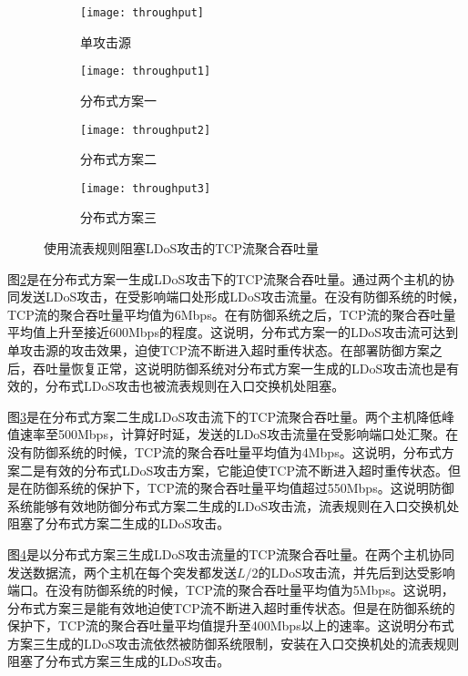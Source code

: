 \begin{figure}
    \begin{subfigure}{.49\textwidth}
        \centering
        \texttt{[image: throughput]}
        \caption{单攻击源}
        \label{fig:throughput-single}
    \end{subfigure}
    \begin{subfigure}{.49\textwidth}
        \centering
        \texttt{[image: throughput1]}
        \caption{分布式方案一}
        \label{fig:throughput-2h-mod1}
    \end{subfigure}

    \begin{subfigure}{.49\textwidth}
        \centering
        \texttt{[image: throughput2]}
        \caption{分布式方案二}
        \label{fig:throughput-2h-mod2}
    \end{subfigure}
    \begin{subfigure}{.49\textwidth}
        \centering
        \texttt{[image: throughput3]}
        \caption{分布式方案三}
        \label{fig:throughput-2h-mod3}
    \end{subfigure}


    \caption{使用流表规则阻塞LDoS攻击的TCP流聚合吞吐量}
    \label{fig:throughput-all}
\end{figure}

图\ref{fig:throughput-2h-mod1}是在分布式方案一生成LDoS攻击下的TCP流聚合吞吐量。通过两个主机的协同发送LDoS攻击，在受影响端口处形成LDoS攻击流量。在没有防御系统的时候，TCP流的聚合吞吐量平均值为6Mbps。在有防御系统之后，TCP流的聚合吞吐量平均值上升至接近600Mbps的程度。这说明，分布式方案一的LDoS攻击流可达到单攻击源的攻击效果，迫使TCP流不断进入超时重传状态。在部署防御方案之后，吞吐量恢复正常，这说明防御系统对分布式方案一生成的LDoS攻击流也是有效的，分布式LDoS攻击也被流表规则在入口交换机处阻塞。

图\ref{fig:throughput-2h-mod2}是在分布式方案二生成LDoS攻击流下的TCP流聚合吞吐量。两个主机降低峰值速率至500Mbps，计算好时延，发送的LDoS攻击流量在受影响端口处汇聚。在没有防御系统的时候，TCP流的聚合吞吐量平均值为4Mbps。这说明，分布式方案二是有效的分布式LDoS攻击方案，它能迫使TCP流不断进入超时重传状态。但是在防御系统的保护下，TCP流的聚合吞吐量平均值超过550Mbps。这说明防御系统能够有效地防御分布式方案二生成的LDoS攻击流，流表规则在入口交换机处阻塞了分布式方案二生成的LDoS攻击。

图\ref{fig:throughput-2h-mod3}是以分布式方案三生成LDoS攻击流量的TCP流聚合吞吐量。在两个主机协同发送数据流，两个主机在每个突发都发送$L/2$的LDoS攻击流，并先后到达受影响端口。在没有防御系统的时候，TCP流的聚合吞吐量平均值为5Mbps。这说明，分布式方案三是能有效地迫使TCP流不断进入超时重传状态。但是在防御系统的保护下，TCP流的聚合吞吐量平均值提升至400Mbps以上的速率。这说明分布式方案三生成的LDoS攻击流依然被防御系统限制，安装在入口交换机处的流表规则阻塞了分布式方案三生成的LDoS攻击。

